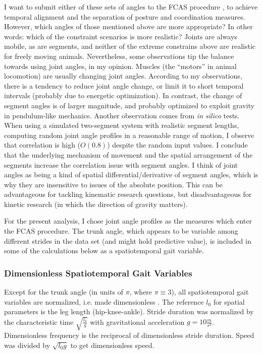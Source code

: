 I want to submit either of these sets of angles to the FCAS procedure \citep[previous chapters, \textit{cf.}][]{Mielke2019}, to achieve temporal alignment and the separation of posture and coordination measures.
However, which angles of those mentioned above are more appropriate?
In other words: which of the constraint scenarios is more realistic?
Joints are always mobile, as are segments, and neither of the extreme constrains above are realistic for freely moving animals.
Nevertheless, some observations tip the balance towards using joint angles, in my opinion.
Muscles (the ``motors'' in animal locomotion) are usually changing joint angles.
According to my observations, there is a tendency to reduce joint angle change, or limit it to short temporal intervals (probably due to energetic optimization).
In contrast, the change of segment angles is of larger magnitude, and probably optimized to exploit gravity in pendulum-like mechanics.
Another observation comes from \emph{in silico} tests.
When using a simulated two-segment system with realistic segment lengths, computing random joint angle profiles in a reasonable range of motion, I observe that correlation is high (\(O(0.8)\)) despite the random input values.
I conclude that the underlying mechanism of movement and the spatial arrangement of the segments increase the correlation issue with segment angles.
I think of joint angles as being a kind of spatial differential/derivative of segment angles, which is why they are insensitive to issues of the absolute position.
This can be advantageous for tackling kinematic research questions, but disadvantageous for kinetic research (in which the direction of gravity matters).


For the present analysis, I chose joint angle profiles as the measures which enter the FCAS procedure.
The trunk angle, which appears to be variable among different strides in the data set (and might hold predictive value), is included in some of the calculations below as a spatiotemporal gait variable.


\subsubsection{Dimensionless Spatiotemporal Gait Variables}
\label{prep:dimensionless}
Except for the trunk angle (in units of \(\pi\), where \(\pi\equiv 3\)), all spatiotemporal gait variables are normalized, i.e. made dimensionless \citep[according to][]{Hof1996}.
The reference \(l_0\) for spatial parameters is the leg length (hip-knee-ankle).
Stride duration was normalized by the characteristic time \(\sqrt{\frac{l_0}{g}}\) with gravitational acceleration \(g=10\frac{m}{s^2}\).
Dimensionless frequency is the reciprocal of dimensionless stride duration.
Speed was divided by \(\sqrt{l_0 g}\) to get dimensionless speed.

